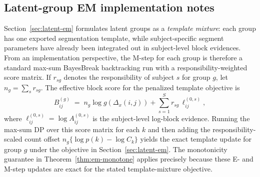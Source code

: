 \subsection{Latent-group EM implementation notes}
\label{sec:alg-em}

Section~\ref{sec:latent-em} formulates latent groups as a \emph{template mixture}: each group has one
exported segmentation template, while subject-specific segment parameters have already been integrated out in
subject-level block evidences. From an implementation perspective, the M-step for each group is therefore a
standard max-sum BayesBreak backtracking run with a responsibility-weighted score matrix.
If $r_{sg}$ denotes the responsibility of subject $s$ for group $g$, let
$n_g=\sum_s r_{sg}$. The effective block score for the penalized template objective is
\begin{equation}
    B^{(g)}_{ij}
    \;=\; n_g\log g(\Delta_x(i,j)) + \sum_{s=1}^S r_{sg}\, \ell^{(0,s)}_{ij},
\end{equation}
where $\ell^{(0,s)}_{ij}=\log A^{(0,s)}_{ij}$ is the subject-level log-block evidence.
Running the max-sum DP over this score matrix for each $k$ and then adding the responsibility-scaled
count offset $n_g\{\log p(k)-\log C_k\}$ yields the exact template update for group $g$ under the
objective in Section~\ref{sec:latent-em}.
The monotonicity guarantee in Theorem~\ref{thm:em-monotone} applies precisely because these E- and M-step
updates are exact for the stated template-mixture objective.

